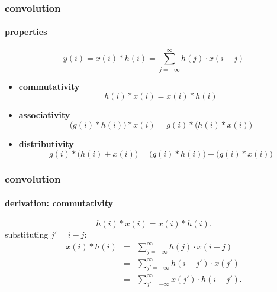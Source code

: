 	\begin{frame}\frametitle{convolution}\framesubtitle{properties}
		\begin{equation}
			y(i) = x(i) \ast h(i) = \sum\limits_{j=-\infty}^{\infty}{h(j)\cdot x(i-j)}
		\end{equation}
		\begin{itemize}
			\item	\textbf{commutativity}
				\begin{equation}
					h(i) \ast x(i)	= x(i) \ast h(i)
				\end{equation}
			\pause
			\item	\textbf{associativity}
				\begin{equation}
					\big(g(i) \ast h(i)\big) \ast x(i) = g(i) \ast \big(h(i) \ast x(i)\big)
				\end{equation}
			\pause
			\item	\textbf{distributivity}
				\begin{equation}
					g(i) \ast \big(h(i) + x(i)\big) = \big(g(i) \ast h(i)\big) + \big(g(i) \ast x(i)\big)
				\end{equation}
		\end{itemize}
\end{frame}

\begin{frame}\frametitle{convolution}\framesubtitle{derivation: commutativity}
\begin{footnotesize}
		\begin{equation}
			h(i) \ast x(i)	= x(i) \ast h(i) .
		\end{equation}
		substituting $j'=i-j$:
		\begin{eqnarray}
			x(i) \ast h(i)
					&=& \sum\limits_{j=-\infty}^{\infty}{h(j)\cdot x(i-j)}\nonumber\\
                    &=& \sum\limits_{j'=-\infty}^{\infty}{h(i-j')\cdot x(j')}\nonumber\\
					&=& \sum\limits_{j'=-\infty}^{\infty}{x(j')\cdot h(i-j')} .
		\end{eqnarray}
\end{footnotesize}
\end{frame}	

